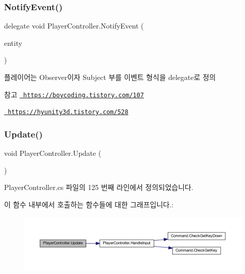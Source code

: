 \mbox{\label{class_player_controller_a934c7f80b80276620cd60eaaeea7520e}} 
\subsubsection{\texorpdfstring{NotifyEvent()}{NotifyEvent()}}
{\footnotesize\ttfamily delegate void Player\+Controller.\+Notify\+Event (\begin{DoxyParamCaption}\item[{Game\+Object}]{entity }\end{DoxyParamCaption})}



플레이어는 Observer이자 Subject 부를 이벤트 형식을 delegate로 정의 

\begin{DoxySeeAlso}{참고}
\href{https://boycoding.tistory.com/107}{\texttt{ https\+://boycoding.\+tistory.\+com/107}} 

\href{https://hyunity3d.tistory.com/528}{\texttt{ https\+://hyunity3d.\+tistory.\+com/528}} 
\end{DoxySeeAlso}
\mbox{\label{class_player_controller_ae8bc83dffb99867a04be016473ed2c43}} 
\subsubsection{\texorpdfstring{Update()}{Update()}}
{\footnotesize\ttfamily void Player\+Controller.\+Update (\begin{DoxyParamCaption}{ }\end{DoxyParamCaption})\hspace{0.3cm}{\ttfamily [private]}}



Player\+Controller.\+cs 파일의 125 번째 라인에서 정의되었습니다.


\begin{DoxyCode}{0}

\end{DoxyCode}
이 함수 내부에서 호출하는 함수들에 대한 그래프입니다.\+:
\nopagebreak
\begin{figure}[H]
\begin{center}
\leavevmode
\includegraphics[width=350pt]{dc/dde/class_player_controller_ae8bc83dffb99867a04be016473ed2c43_cgraph}
\end{center}
\end{figure}


